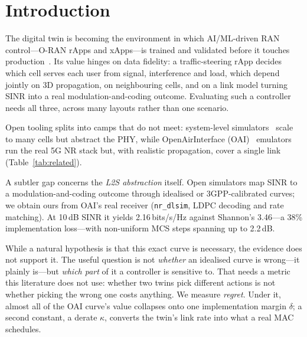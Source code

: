 \documentclass[conference]{IEEEtran}
\begin{document}
\section{Introduction}
The digital twin is becoming the environment in which AI/ML-driven RAN control---O-RAN rApps and xApps---is trained and validated before it touches production~\cite{dt_survey}. Its value hinges on data fidelity: a traffic-steering rApp decides which cell serves each user from signal, interference and load, which depend jointly on 3D propagation, on neighbouring cells, and on a link model turning SINR into a real modulation-and-coding outcome. Evaluating such a controller needs all three, across many layouts rather than one scenario.

Open tooling splits into camps that do not meet: system-level simulators~\cite{lena} scale to many cells but abstract the PHY, while OpenAirInterface (OAI)~\cite{oai} emulators run the real 5G NR stack but, with realistic propagation, cover a single link (Table~\ref{tab:related}).

A subtler gap concerns the \emph{L2S abstraction} itself. Open simulators map SINR to a modulation-and-coding outcome through idealised or 3GPP-calibrated curves; we obtain ours from OAI's real receiver (\texttt{nr\_dlsim}, LDPC decoding and rate matching). At 10\,dB SINR it yields 2.16\,bits/s/Hz against Shannon's 3.46---a 38\% implementation loss---with non-uniform MCS steps spanning up to 2.2\,dB.

While a natural hypothesis is that this exact curve is necessary, the evidence does not support it. The useful question is not \emph{whether} an idealised curve is wrong---it plainly is---but \emph{which part} of it a controller is sensitive to. That needs a metric this literature does not use: whether two twins pick different actions is not whether picking the wrong one costs anything. We measure \emph{regret}. Under it, almost all of the OAI curve's value collapses onto one implementation margin $\delta$; a second constant, a derate $\kappa$, converts the twin's link rate into what a real MAC schedules.
\end{document}
